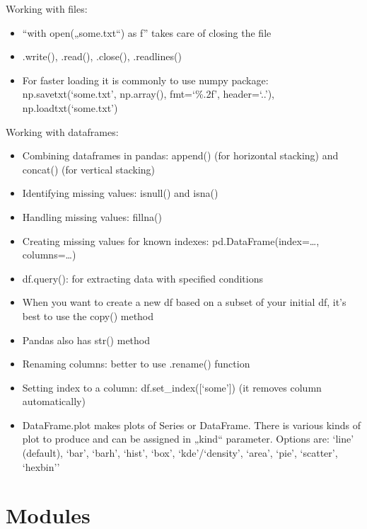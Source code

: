 \documentclass[
  letterpaper,
  DIV=11,
  numbers=noendperiod]{scrreprt}
\providecommand{\tightlist}{%
  \setlength{\itemsep}{0pt}\setlength{\parskip}{0pt}}\usepackage{longtable,booktabs,array}
\begin{document}
Working with files:

\begin{itemize}
\tightlist
\item
  ``with open(„some.txt``) as f'' takes care of closing the file
\item
  .write(), .read(), .close(), .readlines()
\item
  For faster loading it is commonly to use numpy package:
  np.savetxt(`some.txt', np.array(), fmt=`\%.2f', header=`..'),
  np.loadtxt(`some.txt')
\end{itemize}

Working with dataframes:

\begin{itemize}
\tightlist
\item
  Combining dataframes in pandas: append() (for horizontal stacking) and
  concat() (for vertical stacking)
\item
  Identifying missing values: isnull() and isna()
\item
  Handling missing values: fillna()
\item
  Creating missing values for known indexes: pd.DataFrame(index=\ldots,
  columns=\ldots)
\item
  df.query(): for extracting data with specified conditions
\item
  When you want to create a new df based on a subset of your initial df,
  it's best to use the copy() method
\item
  Pandas also has str() method
\item
  Renaming columns: better to use .rename() function
\item
  Setting index to a column: df.set\_index({[}`some'{]}) (it removes
  column automatically)
\item
  DataFrame.plot makes plots of Series or DataFrame. There is various
  kinds of plot to produce and can be assigned in „kind`` parameter.
  Options are: `line' (default), `bar', `barh', `hist', `box',
  `kde'/`density', `area', `pie', `scatter', `hexbin''
\end{itemize}

\hypertarget{modules}{%
\section{Modules}\label{modules}}
\end{document}
